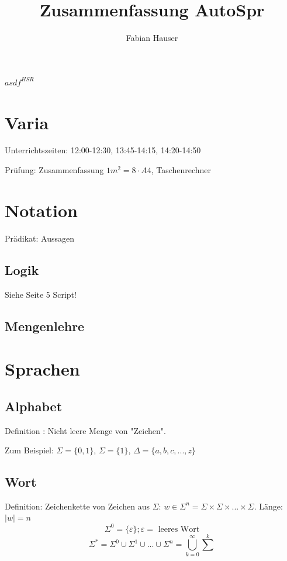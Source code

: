 

\title{Zusammenfassung AutoSpr}
\author{Fabian Hauser}
 

\maketitle

$asdf^{HSR}$

\section{Varia}
Unterrichtszeiten: 12:00-12:30, 13:45-14:15, 14:20-14:50

Prüfung: Zusammenfassung $1m^2  = 8 \cdot A4$, Taschenrechner


\section{Notation}
Prädikat:	Aussagen

\subsection{Logik}
Siehe Seite 5 Script!

\subsection{Mengenlehre}

\section{Sprachen}

\subsection{Alphabet}
Definition : Nicht leere Menge von "Zeichen".

Zum Beispiel: $\Sigma = \{0, 1\}$, $\Sigma = \{1\}$, $\Delta = \{a,b,c,...,z\}$


\subsection{Wort}

Definition: Zeichenkette von Zeichen aus $\Sigma$: $w \in \Sigma^n = \Sigma \times \Sigma \times ... \times \Sigma$. Länge: $|w| = n$
\[
	\Sigma^0 = \{\varepsilon\}; \varepsilon = \text{ leeres Wort}
\]
\[
	\Sigma^\ast = \Sigma^0 \cup \Sigma^1 \cup ... \cup \Sigma^n = \bigcup^{\infty}_{k=0}{\sum^k}
\]

